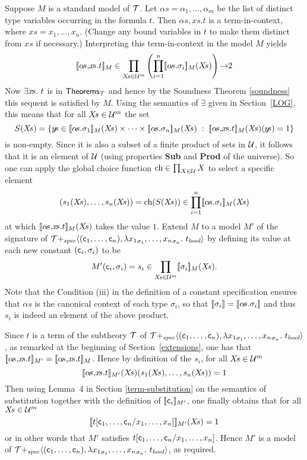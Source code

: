 Suppose $M$ is a standard model of ${\cal T}$.  Let
$\alpha\!s=\alpha_{1},\ldots,\alpha_{m}$ be the list of distinct type
variables occurring in the formula $t$. Then $\alpha\!s,\!x\!s.t$ is a
term-in-context, where $x\!s=x_{1},\ldots,x_{n}$. (Change any bound
variables in $t$ to make them distinct from $x\!s$ if necessary.)
Interpreting this term-in-context in the model $M$ yields
\[
\den{\alpha\!s,\!x\!s.t}_{M} \in \prod_{X\!s\in{\cal U}^{m}}
\left(\prod_{i=1}^{n}\den{\alpha\!s.\sigma_{i}}_{M}(X\!s)\right)
\fun \two
\]
Now $\exists x\!s.\ t$ is in ${\sf Theorems}_{\cal T}$ and hence by the
Soundness Theorem \ref{soundness} this
sequent is satisfied by $M$. Using the semantics of $\exists$ given in
Section~\ref{LOG}, this means that for all $X\!s\in{\cal
U}^{m}$ the set
\[
S(X\!s) = \{y\!s\in\den{\alpha\!s.\sigma_{1}}_{M}(X\!s) \times\cdots\times
          \den{\alpha\!s.\sigma_{n}}_{M}(X\!s)\; : \;
          \den{\alpha\!s,\!x\!s.t}_{M}(X\!s)(y\!s)=1 \}
\]
is non-empty. Since it is also a subset of a finite product of sets in
$\cal U$, it follows that it is an element of $\cal U$ (using properties
{\bf Sub} and {\bf Prod} of the universe). So one can apply the global
choice function $\mbox{\rm ch}\in\prod_{X\in{\cal U}}X$ to select a specific element
\[
(s_{1}(X\!s),\ldots,s_{n}(X\!s)) =
\mbox{\rm ch}(S(X\!s)) \in \prod_{i=1}^{n}[\![\alpha\!s.\sigma_{i}]\!]_{M}(X\!s)
\]
at which  $[\![\alpha\!s,\!x\!s.t]\!]_{M}(X\!s)$ takes the value $1$. Extend
$M$ to a model $M'$ of the signature of ${\cal
T}{+_{\it spec}}\langle({\sf c}_1,\ldots,{\sf c}_n),
\lambda {x_1}_{\sigma_1},\ldots,{x_n}_{\sigma_n}.\ t_{\textsl{bool}}
\rangle$ by defining its value at
each new constant $({\sf c}_{i},\sigma_{i})$ to be
\[
M'({\sf c}_{i},\sigma_{i}) =
s_{i} \in \prod_{X\!s\in{\cal U}^{m}}[\![\sigma_{i}]\!]_{M}(X\!s) .
\]
Note that the Condition (iii) in the definition of a constant
specification ensures that $\alpha\!s$ is the canonical context of each
type $\sigma_{i}$, so that
$[\![\sigma_{i}]\!]=[\![\alpha\!s.\sigma_{i}]\!]$ and thus $s_{i}$ is
indeed an element of the above product.

Since $t$ is a term of the subtheory $\cal T$ of ${\cal
T}{+_{\it spec}}\langle({\sf c}_1,\ldots,{\sf c}_n),
\lambda {x_1}_{\sigma_1},\ldots,{x_n}_{\sigma_n}.\ t_{\textsl{bool}}
\rangle$,
as remarked at the beginning of Section~\ref{extensions}, one has that
$\den{\alpha\!s,\!x\!s.t}_{M'} = \den{\alpha\!s,\!x\!s.t}_{M}$. Hence by
definition of the $s_{i}$, for all $X\!s\in{\cal U}^{m}$
\[
\den{\alpha\!s,\!x\!s.t}_{M'}(X\!s)(s_{1}(X\!s),\ldots,s_{n}(X\!s)) = 1
\]
Then using Lemma~4 in Section
\ref{term-substitution} on the semantics of substitution together with
the definition of $[\![{\sf c}_{i}]\!]_{M'}$, one finally obtains that
for all $X\!s\in{\cal U}^{m}$
\[
[\![t[{\sf c}_{1},\ldots,{\sf c}_{n}/x_{1},\ldots,x_{n}]]\!]_{M'}(X\!s)=1
\]
or in other words that $M'$ satisfies
$t[{\sf c}_{1},\ldots,{\sf c}_{n}/x_{1},\ldots,x_{n}]$.
Hence $M'$ is a model of ${\cal T}{+_{\it
spec}}\langle({\sf c}_1,\ldots,{\sf c}_n),
\lambda {x_1}_{\sigma_1},\ldots,{x_n}_{\sigma_n}.\ t_{\textsl{bool}}
\rangle$, as required.

